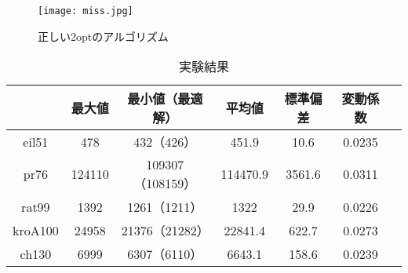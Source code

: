 \documentclass[a4j]{jarticle}
\begin{document}
\begin{figure}[H]
 \begin{center}
  \texttt{[image: miss.jpg]}
  \caption{正しい2optのアルゴリズム}
  \label{miss}
 \end{center}
\end{figure}

\begin{table}[H]
 \begin{center}
  \caption{実験結果}
  \label{re}
  \begin{tabular}[tb]{|c|c|c|c|c|c|c|} \hline
 & 最大値 & 最小値（最適解） & 平均値 & 標準偏差 & 変動係数 \\ \hline
eil51 & 478 & 432（426） & 451.9 & 10.6 & 0.0235 \\\hline
pr76 & 124110 & 109307（108159） & 114470.9 & 3561.6 & 0.0311 \\\hline
rat99 & 1392 & 1261（1211） & 1322 & 29.9 & 0.0226 \\\hline
kroA100 & 24958 & 21376（21282） & 22841.4 & 622.7 & 0.0273 \\\hline
ch130 & 6999 & 6307（6110） & 6643.1 & 158.6 & 0.0239 \\\hline
  \end{tabular}
 \end{center}
\end{table}
\end{document}
